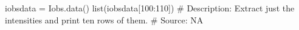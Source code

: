 iobsdata = Iobs.data()
list(iobsdata[100:110])
# Description:  Extract just the intensities and print ten rows of them.
# Source:  NA

